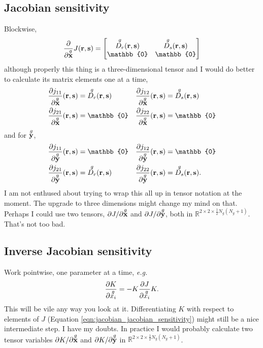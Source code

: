 \subsection{Jacobian sensitivity}

Blockwise,
%
\begin{equation}
\pp{}{\g{\ve x}} J(\ve r, \ve s) = 
\begin{bmatrix}
\g{D_r}(\ve r, \ve s) & \g{D_s}(\ve r, \ve s)
\\ \mathbb{0} & \mathbb{0}
\end{bmatrix}
\end{equation}
%
although properly this thing is a three-dimensional tensor and I would do better to calculate its matrix elements one at a time,
%
\begin{equation}
\begin{aligned}
\pp{j_{11}}{\g{\ve x}}(\ve r, \ve s) &= \g{D_r}(\ve r, \ve s) &\pp{j_{12}}{\g{\ve x}}(\ve r, \ve s) &= \g{D_s}(\ve r, \ve s) \\
\pp{j_{21}}{\g{\ve x}}(\ve r, \ve s) &= \mathbb{0} &\pp{j_{22}}{\g{\ve x}}(\ve r, \ve s) &= \mathbb{0}
\end{aligned}
\end{equation}
%
and for $\overset{g}{\textbf{y}}$,
%
\begin{equation}
\begin{aligned}
\pp{j_{11}}{\g{\ve y}}(\ve r, \ve s) &= \mathbb{0} &\pp{j_{12}}{\g{\ve y}}(\ve r, \ve s) &= \mathbb{0} \\
\pp{j_{21}}{\g{\ve y}}(\ve r, \ve s) &= \g{D_r}(\ve r, \ve s) &\pp{j_{22}}{\g{\ve y}}(\ve r, \ve s) &= \g{D_s}(\ve r, \ve s).
\end{aligned}
\end{equation}
%
I am not enthused about trying to wrap this all up in tensor notation at the moment.  The upgrade to three dimensions might change my mind on that.  Perhaps I could use two tensors, $\partial{J}/\partial{\overset{g}{\textbf{x}}}$ and $\partial{J}/\partial{\overset{g}{\textbf{y}}}$, both in $\mathbb{R}^{2 \times 2 \times \frac{1}{2}N_g(N_g+1)}$.  That's not too bad.

\subsection{Inverse Jacobian sensitivity}

Work pointwise, one parameter at a time, \emph{e.g.}
%
\begin{equation}
\frac{\partial{K}}{\partial{\overset{g}{x_i}}} = - K \frac{\partial{J}}{\partial{\overset{g}{x_i}}} K.
\end{equation}
%
This will be vile any way you look at it.  Differentiating $K$ with respect to elements of $J$ (Equation \ref{eqn:jacobian_jacobian_sensitivity}) might still be a nice intermediate step.  I have my doubts.  In practice I would probably calculate two tensor variables $\partial{K}/\partial{\overset{g}{\textbf{x}}}$ and $\partial{K}/\partial{\overset{g}{\textbf{y}}}$ in $\mathbb{R}^{2 \times 2 \times \frac{1}{2}N_g(N_g+1)}$.

